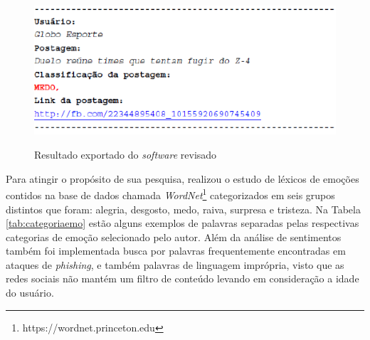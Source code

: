 \begin{figure}[!h]
\centering 
\caption{Resultado exportado do \textit{software} revisado}
\includegraphics[scale=0.60]{imagens/exportadofilipe.png}
\label{fig:exportadotccfilipe}
\end{figure}

\newpage
Para atingir o propósito de sua pesquisa,  realizou o estudo de léxicos de emoções contidos na base de dados chamada \textit{WordNet}\footnote{https://wordnet.princeton.edu} categorizados em seis grupos distintos que foram: alegria, desgosto, medo, raiva, surpresa e tristeza. Na Tabela \ref{tab:categoriaemo} estão alguns exemplos de palavras separadas pelas respectivas categorias de emoção selecionado pelo autor. Além da análise de sentimentos também foi implementada busca por palavras frequentemente encontradas em ataques de \textit{phishing},  e também palavras de linguagem imprópria, visto que as redes sociais não mantém um filtro de conteúdo levando em consideração a idade do usuário.

